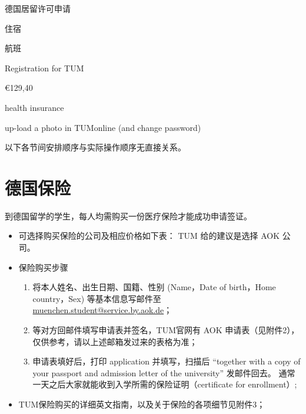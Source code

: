 \documentclass{article}
\begin{document}
\begin{Form}
\begin{enumerate}[label = {\CheckBox[width=.1in,height=.1in,name=process\theenumi]{}}]
  \item 德国居留许可申请
  \item 住宿
  \item 航班
  \item Registration for TUM
  \begin{multicols}{2}
  \begin{enumerate}[label = {\CheckBox[width=.1in,height=.1in,name=subprocess\theenumii]{}}]
    \item \euro{129,40}
    \item health insurance
    \item up-load a photo in TUMonline (and change password)
  \end{enumerate}
  \end{multicols}
  \end{enumerate}
\end{Form}

\newpage
\tableofcontents
\newpage

以下各节间安排顺序与实际操作顺序无直接关系。

\section{德国保险}
到德国留学的学生，每人均需购买一份医疗保险才能成功申请签证。%
\begin{itemize}
\item 可选择购买保险的公司及相应价格如下表：%
TUM 给的建议是选择 AOK 公司。
\item 保险购买步骤
\begin{enumerate}
\item 将本人姓名、出生日期、国籍、性别 (Name，Date of birth，Home country，Sex) 等基本信息写邮件至 \sloppy \href{mailto:muenchen.student@service.by.aok.de}{muenchen.student@service.by.aok.de}；%
\item 等对方回邮件填写申请表并签名，TUM官网有 AOK 申请表（见附件2），仅供参考，请以上述邮箱发过来的表格为准；
\item 申请表填好后，打印 application 并填写，扫描后 ``together with a copy of your passport and admission letter of the university'' 发邮件回去。%
通常一天之后大家就能收到入学所需的保险证明（certificate for enrollment）;
\end{enumerate}
\item TUM保险购买的详细英文指南，以及关于保险的各项细节见附件3；
\end{itemize}
\end{document}
